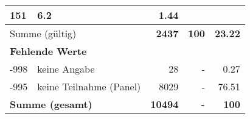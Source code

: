 \begin{longtable}{lXrrr}
       \num{151} &
       \num[round-mode=places,round-precision=2]{6,2} &
         \num[round-mode=places,round-precision=2]{1,44} \\
     \midrule
     \multicolumn{2}{l}{Summe (gültig)} &
       \textbf{\num{2437}} &
     \textbf{100} &
       \textbf{\num[round-mode=places,round-precision=2]{23,22}} \\
     \multicolumn{5}{l}{\textbf{Fehlende Werte}}\\
       -998 &
       keine Angabe &
         \num{28} &
        - &
         \num[round-mode=places,round-precision=2]{0,27} \\
       -995 &
       keine Teilnahme (Panel) &
         \num{8029} &
        - &
         \num[round-mode=places,round-precision=2]{76,51} \\
     \midrule
     \multicolumn{2}{l}{\textbf{Summe (gesamt)}} &
          \textbf{\num{10494}} &
        \textbf{-} &
        \textbf{100} \\
     \bottomrule
     \end{longtable}
     
